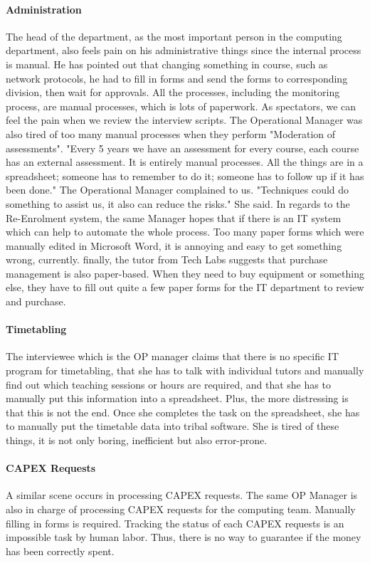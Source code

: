 \paragraph{Administration}
The head of the department, as the most important person in the computing department, also feels pain on his administrative things since the internal process is manual. He has pointed out that changing something in course, such as network protocols, he had to fill in forms and send the forms to corresponding division, then wait for approvals. All the processes, including the monitoring process, are manual processes, which is lots of paperwork. As spectators, we can feel the pain when we review the interview scripts. The Operational Manager was also tired of too many manual processes when they perform "Moderation of assessments". "Every 5 years we have an assessment for every course, each course has an external assessment. It is entirely manual processes. All the things are in a spreadsheet; someone has to remember to do it; someone has to follow up if it has been done." The Operational Manager complained to us. "Techniques could do something to assist us, it also can reduce the risks." She said. In regards to the Re-Enrolment system, the same Manager hopes that if there is an IT system which can help to automate the whole process. Too many paper forms which were manually edited in Microsoft Word, it is annoying and easy to get something wrong, currently. finally, the tutor from Tech Labs suggests that purchase management is also paper-based. When they need to buy equipment or something else, they have to fill out quite a few paper forms for the IT department to review and purchase.

\paragraph{Timetabling}
The interviewee which is the OP manager claims that there is no specific IT program for timetabling, that she has to talk with individual tutors and manually find out which teaching sessions or hours are required, and that she has to manually put this information into a spreadsheet. Plus, the more distressing is that this is not the end. Once she completes the task on the spreadsheet, she has to manually put the timetable data into tribal software. She is tired of these things, it is not only boring, inefficient but also error-prone. 

\paragraph{CAPEX Requests}
A similar scene occurs in processing CAPEX requests. The same OP Manager is also in charge of processing CAPEX requests for the computing team. Manually filling in forms is required. Tracking the status of each CAPEX requests is an impossible task by human labor. Thus, there is no way to guarantee if the money has been correctly spent.

